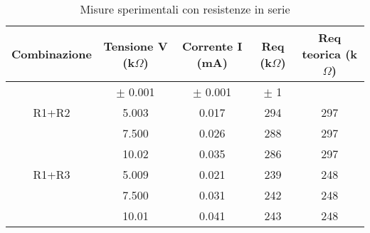 \begin{table}[H]
\caption{Misure sperimentali con resistenze in serie}
\begin{tabular}{|c|c|c|c|c|}
\hline
    Combinazione & Tensione V (k$\Omega$) & Corrente I (mA) & Req (k$\Omega$) & Req teorica (k$\Omega$) \\ \hline
     & $\pm$ 0.001 &  $\pm$ 0.001 & $\pm$ 1 & \\ 
     \hline
    R1+R2   & 5.003 & 0.017 & 294 & 297 \\ 
            & 7.500 & 0.026 & 288 & 297 \\
            & 10.02 & 0.035 & 286 & 297 \\
    R1+R3   & 5.009 & 0.021 & 239 & 248 \\
            & 7.500 & 0.031 & 242 & 248 \\
            & 10.01 & 0.041 & 243 & 248 \\
    \hline
\end{tabular}
\label{}
\end{table}